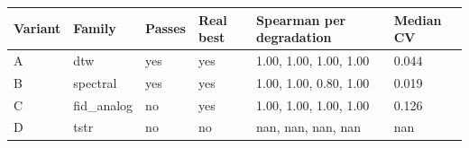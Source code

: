 \begin{tabular}{llllll}
\toprule
Variant & Family & Passes & Real best & Spearman per degradation & Median CV \\
\midrule
A & dtw & yes & yes & 1.00, 1.00, 1.00, 1.00 & 0.044 \\
B & spectral & yes & yes & 1.00, 1.00, 0.80, 1.00 & 0.019 \\
C & fid\_analog & no & yes & 1.00, 1.00, 1.00, 1.00 & 0.126 \\
D & tstr & no & no & nan, nan, nan, nan & nan \\
\bottomrule
\end{tabular}
